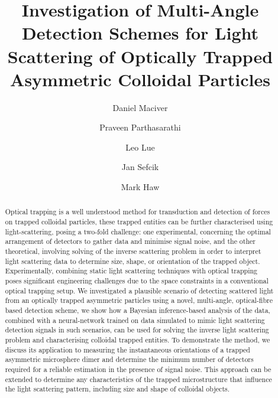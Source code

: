 \documentclass[preprint,  3p]{elsarticle}
\begin{document}
\begin{frontmatter}

\title{Investigation of Multi-Angle Detection Schemes for Light Scattering of Optically Trapped Asymmetric Colloidal Particles}


\author[aff1]{Daniel Maciver} 

\author[aff1]{Praveen Parthasarathi}

\author[aff1]{Leo Lue}

\author[aff1]{Jan Sefcik}

\author[aff1]{Mark Haw}

\begin{abstract}
  Optical trapping is a well understood method for transduction and detection
  of forces on trapped colloidal particles, these trapped entities can be
  further characterised using light-scattering, posing a two-fold challenge:
  one experimental, concerning the optimal arrangement of detectors to gather
  data and minimise signal noise, and the other theoretical, involving solving
  of the inverse scattering problem in order to interpret light scattering
  data to determine size, shape, or orientation of the trapped object.
  Experimentally, combining static light scattering techniques with optical
  trapping poses significant engineering challenges due to the space
  constraints in a conventional optical trapping setup. We investigated a
  plausible scenario of detecting scattered light from an optically trapped
  asymmetric particles using a novel, multi-angle, optical-fibre based
  detection scheme, we show how a Bayesian inference-based analysis of the
  data, combined with a neural-network trained on data simulated to mimic
  light scattering detection signals in such scenarios, can be used for
  solving the inverse light scattering problem and characterising colloidal
  trapped entities. To demonstrate the method, we discuss its application to
  measuring the instantaneous orientations of a trapped asymmetric microsphere
  dimer and determine the minimum number of detectors required for a reliable
  estimation in the presence of signal noise. This approach can be extended to
  determine any characteristics of the trapped microstructure that influence
  the light scattering pattern, including size and shape of colloidal objects. 
\end{abstract}


\end{frontmatter}
\end{document}
